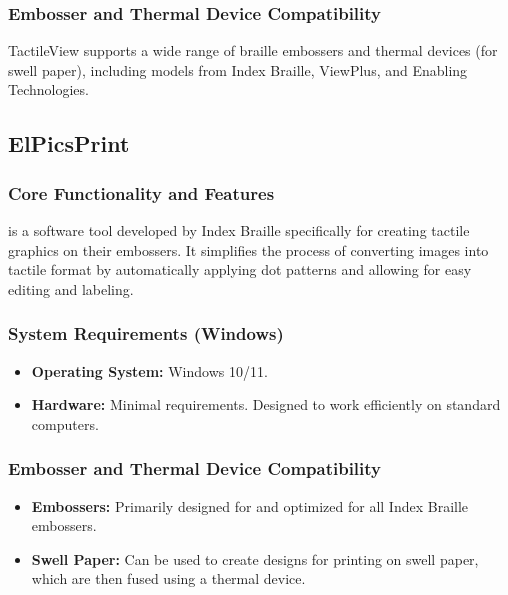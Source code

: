\subsubsection{Embosser and Thermal Device Compatibility}\label{ch14:sssec:tactileview-compat}
TactileView supports a wide range of braille embossers and thermal devices (for swell paper), including models from Index Braille, ViewPlus, and Enabling Technologies\supercite{IrieTactileView}.

\subsection{ElPicsPrint}\label{ch14:ssec:elpicsprint}
\subsubsection{Core Functionality and Features}\label{ch14:sssec:elpicsprint-features}
 is a software tool developed by Index Braille\supercite{ElitaElPicsPrint} specifically for creating tactile graphics on their embossers. It simplifies the process of converting images into tactile format by automatically applying dot patterns and allowing for easy editing and labeling\supercite{ElitaManual}.

\subsubsection{System Requirements (Windows)}\label{ch14:sssec:elpicsprint-sysreq}
\begin{itemize}
	\item \textbf{Operating System:} Windows 10/11.
	\item \textbf{Hardware:} Minimal requirements. Designed to work efficiently on standard computers.
\end{itemize}

\subsubsection{Embosser and Thermal Device Compatibility}\label{ch14:sssec:elpicsprint-compat}
\begin{itemize}
	\item \textbf{Embossers:} Primarily designed for and optimized for all Index Braille embossers.
	\item \textbf{Swell Paper:} Can be used to create designs for printing on swell paper, which are then fused using a thermal device.
\end{itemize}

